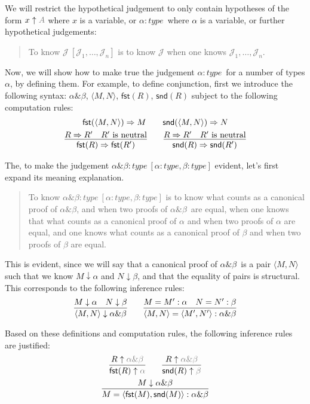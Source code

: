 \documentclass{amsart}
\theoremstyle{definition}
\theoremstyle{remark}
\numberwithin{equation}{section}
\newcommand\reduce[2]{\ensuremath{#1\Rightarrow#2}}
\newcommand\lfhyp[2]{\ensuremath{#1\ [#2]}}
\newcommand\infers[2]{\ensuremath{#1\uparrow{\color{Gray}{#2}}}}
\newcommand\checks[2]{\ensuremath{#1\downarrow#2}}
\newcommand\type[1]{\ensuremath{#1:\mathit{type}}}
\newcommand\product[2]{\ensuremath{#1\&#2}}
\newcommand\pair[2]{\ensuremath{\langle #1,#2\rangle}}
\newcommand\fst[1]{\ensuremath{\mathsf{fst}(#1)}}
\newcommand\snd[1]{\ensuremath{\mathsf{snd}(#1)}}
\begin{document}
We will restrict the hypothetical judgement to only contain hypotheses of the
form \infers{x}{A} where $x$ is a variable, or \type\alpha\ where $\alpha$ is a
variable, or further hypothetical judgements:
\begin{quote}
  To know
  \lfhyp{\mathcal{J}}{\mathcal{J}_1,\dots,\mathcal{J}_n} is
  to know $\mathcal{J}$ when one knows
  $\mathcal{J}_1,\dots,\mathcal{J}_n$.
\end{quote}

Now, we will show how to make true the judgement \type\alpha\ for a number of
types $\alpha$, by defining them. For example, to define conjunction, first we
introduce the following syntax: \product\alpha\beta, \pair{M}{N}, \fst{R},
\snd{R} subject to the following computation rules:
\begin{gather*}
  \reduce{\fst{\pair{M}{N}}}{M}
  \qquad
  \reduce{\snd{\pair{M}{N}}}{N}\\
  \infer{
    \reduce{\fst{R}}{\fst{R'}}
  }{
    \reduce{R}{R'} &
    \text{$R'$ is neutral}
  }
  \qquad
  \infer{
    \reduce{\snd{R}}{\snd{R'}}
  }{
    \reduce{R}{R'} &
    \text{$R'$ is neutral}
  }
\end{gather*}

The, to make the judgement
\lfhyp{\type{\product\alpha\beta}}{\type\alpha,\type\beta} evident, let's first
expand its meaning explanation.
\begin{quote}
  To know \lfhyp{\type{\product\alpha\beta}}{\type\alpha,\type\beta} is to know
  what counts as a canonical proof of \product\alpha\beta, and when two proofs
  of \product\alpha\beta\ are equal, when one knows that what counts as a
  canonical proof of $\alpha$ and when two proofs of $\alpha$ are equal, and
  one knows what counts as a canonical proof of $\beta$ and when two proofs of
  $\beta$ are equal.
\end{quote}

This is evident, since we will say that a canonical proof of
\product\alpha\beta\ is a pair \pair{M}{N} such that we know \checks{M}{\alpha}
and \checks{N}{\beta}, and that the equality of pairs is structural. This
corresponds to the following inference rules:
\[
  \infer{
    \checks{\pair{M}{N}}{\product\alpha\beta}
  }{
    \checks{M}{\alpha} &
    \checks{N}{\beta}
  }
  \qquad
  \infer{
    \pair{M}{N}=\pair{M'}{N'}:\product\alpha\beta
  }{
    M=M':\alpha &
    N=N':\beta
  }
\]

Based on these definitions and computation rules, the following inference rules are justified:
\begin{gather*}
  \infer{
    \infers{\fst{R}}{\alpha}
  }{
    \infers{R}{\product\alpha\beta}
  }
  \qquad
  \infer{
    \infers{\snd{R}}{\beta}
  }{
    \infers{R}{\product\alpha\beta}
  }\\
  \infer{
    M=\pair{\fst{M}}{\snd{M}}:\product\alpha\beta
  }{
    \checks{M}{\product\alpha\beta}
  }
\end{gather*}
\end{document}
